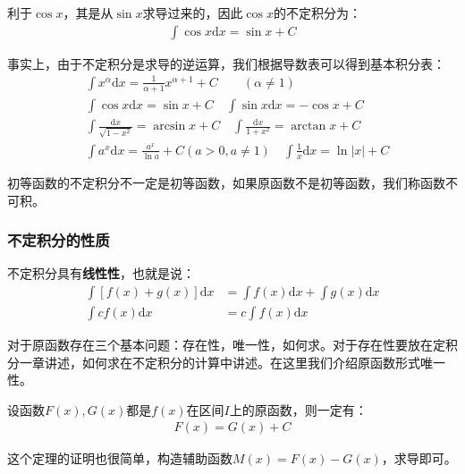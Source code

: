 \documentclass{ctexart}
\let\oldtextbf\textbf %
\renewcommand{\textbf}[1]{\textcolor{btex}{\oldtextbf{#1}}} %
\begin{document}
利于$\cos x$，其是从$\sin x$求导过来的，因此$\cos x$的不定积分为：
\begin{align*}
    \int \cos x\mathrm{d}x=\sin x+C
\end{align*}

\begin{tcolorbox}[
    colback=bac1,     %
    colframe=fra1,   %
    coltitle=white,             %
    coltext=tex1,
    title=基本积分表,
    fonttitle=\bfseries,        %
arc=3mm,                     %
breakable
]
事实上，由于不定积分是求导的逆运算，我们根据导数表可以得到基本积分表：
\begin{align*}
&\int x^\alpha\mathrm{d}x=\frac{1}{\alpha+1}x^{\alpha+1}+C\qquad (\alpha\neq 1)\tag{4-1}\\
 &\int \cos x\mathrm{d}x=\sin x+C\quad \int \sin x\mathrm{d}x=-\cos x+C\tag{4-2}\\
&\int \frac{\mathrm{d}x}{\sqrt{1-x^2}}=\arcsin x+C\quad \int\frac{\mathrm{d}x}{1+x^2}=\arctan x+C\tag{4-3}\\
&\int a^x\mathrm{d}x=\frac{a^x}{\ln a}+C (a>0,a\neq 1)\quad \int\frac{1}{x}\mathrm{d}x=\ln|x|+C\tag{4-4}       
\end{align*}
\end{tcolorbox}

初等函数的不定积分不一定是初等函数，如果原函数不是初等函数，我们称函数不可积。
\subsubsection{不定积分的性质}
不定积分具有\textbf{线性性}，也就是说：
\begin{align*}
    \int [f(x)+g(x)]\mathrm{d}x&=\int f(x)\mathrm{d}x+\int g(x)\mathrm{d}x\\
    \int cf(x)\mathrm{d}x&=c\int f(x)\mathrm{d}x
\end{align*}

对于原函数存在三个基本问题：存在性，唯一性，如何求。对于存在性要放在定积分一章讲述，如何求在不定积分的计算中讲述。在这里我们介绍原函数形式唯一性。

\begin{tcolorbox}[
    colback=bac2,     %
    colframe=fra2,   %
    coltitle=white,             %
    coltext=tex2,
    title=不定积分原函数形式唯一性,
    fonttitle=\bfseries,        %
arc=3mm,                     %
breakable
]
设函数$F(x),G(x)$都是$f(x)$在区间$I$上的原函数，则一定有：
\begin{align*}
    F(x)=G(x)+C
\end{align*}

这个定理的证明也很简单，构造辅助函数$M(x)=F(x)-G(x)$，求导即可。
\end{tcolorbox}
\end{document}
